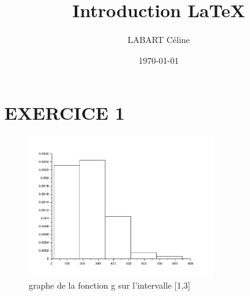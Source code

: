 \documentclass[11pt,twoside,a4paper]{article}
\title{Introduction  {\LaTeX}}
\date{\today}
\author{LABART Céline}
\theoremstyle{plain}
\theoremstyle{remark}
\begin{document}
\maketitle
\section{EXERCICE 1}

\begin{figure}[htbp]
\centering
\includegraphics[width=8cm]{hist.pdf}
\caption{graphe de la fonction g sur l'intervalle [1,3]}
\end{figure}

\tableofcontents
\listoffigures
\end{document}
